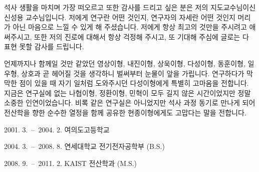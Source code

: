 \documentclass[master,english,final]{kaist-ucs}
\begin{document}




\acknowledgement

석사 생활을 마치며 가장 떠오르고 또한 감사를 드리고 싶은 분은 저의 지도교수님이신
신성용 교수님입니다. 저에게 연구란 어떤 것인지, 연구자의 자세란 어떤 것인지
머리가 아닌 마음으로 느낄 수 있게 해 주셨습니다. 저에게 항상 최고의 것만을
주시려고 애써주시고, 또한 저의 진로에 대해서 항상 걱정해 주시고,
또 기대해 주심에 글로는 다 표현 못할 감사를 드립니다.

언제까지나 함께일 것만 같았던 영상이형, 내진이형, 상욱이형, 다성이형,
동훈이형, 일우형, 상호과 곧 헤어질 것을 생각하니 벌써부터 눈물이 앞을 가립니다.
연구하다가 막막한 점이 있을 때 자기 일처럼 도와주시던 다성이형에게 특별히 고마움을 전합니다.
지금은 연구실에 없는 나협이형, 정환이형,
민혁이 모두 길지 않은 시간이었지만 정말 소중한 인연이었습니다.
비록 같은 연구실은 아니었지만 석사 과정 동기로 만나게 되어
전산학을 향한 순수한 열정을 함께 공유한 현종이형에게도 고맙다는 말을
전합니다.

%
\curriculumvitae[korean]

    \begin{personaldata}
        \address    {서울특별시 관악구 봉천동 복권아파트 3동 305호}
    \end{personaldata}

    \begin{education}
        \item[2001. 3.\ --\ 2004. 2.] 여의도고등학교
        \item[2004. 3.\ --\ 2008. 8.] 연세대학교 전기전자공학부 (B.S.)
        \item[2008. 9.\ --\ 2011. 2.] KAIST 전산학과 (M.S.)
    \end{education}
\end{document}
